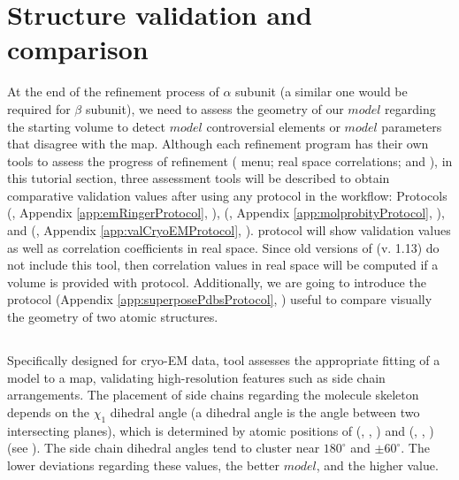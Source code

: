 \section{Structure validation and comparison}
\label{seq:structurevalidation}
 At the end of the refinement process of  $\alpha$ subunit (a similar one would be required for $\beta$ subunit), we need to assess the geometry of our $model$ regarding the starting volume to detect $model$ controversial elements or $model$ parameters that disagree with the map. Although each refinement program has their own tools to assess the progress of refinement (\coot {} menu; \phenix {} real space correlations;  {} and ), in this tutorial section, three assessment tools will be described to obtain comparative validation values after using any protocol in the workflow:  Protocols \emringer (, Appendix \ref{app:emRingerProtocol}, \citep{barad2015}), \molprobity (, Appendix \ref{app:molprobityProtocol}, \citep{davis2004}), and \validationCryoEM (, Appendix \ref{app:valCryoEMProtocol}, \citep{afonine2018b}). \validationCryoEM protocol will show \molprobity validation values as well as correlation coefficients in real space. Since old versions of \phenix (v. 1.13) do not include this tool, then correlation values in real space will be computed if a volume is provided with \molprobity protocol. Additionally, we are going to introduce the protocol  (Appendix \ref{app:superposePdbsProtocol}, \citep{zwartUrl}) useful to compare visually the geometry of two atomic structures.\\


 \subsection*{\emringer}
 
 Specifically designed for cryo-EM data, \emringer tool assesses the appropriate fitting of a model to a map, validating high-resolution features such as side chain arrangements. The placement of side chains regarding the molecule skeleton depends on the $\chi_{1}$ dihedral angle (a dihedral angle is the angle between two intersecting planes), which is determined by atomic positions of (, , ) and (, , ) (see ). The side chain dihedral angles tend to cluster near $180^\circ$ and $\pm60^\circ$. The lower deviations regarding these values, the better $model$, and the higher \emringer value.  

